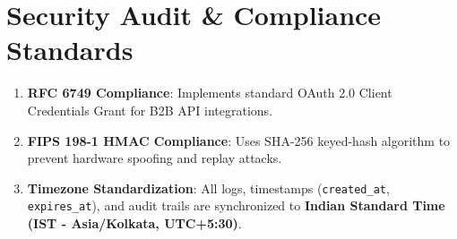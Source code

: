 \documentclass[12pt,a4paper]{article}
\begin{document}
\section{Security Audit \& Compliance Standards}
\begin{enumerate}
    \item \textbf{RFC 6749 Compliance}: Implements standard OAuth 2.0 Client Credentials Grant for B2B API integrations.
    \item \textbf{FIPS 198-1 HMAC Compliance}: Uses SHA-256 keyed-hash algorithm to prevent hardware spoofing and replay attacks.
    \item \textbf{Timezone Standardization}: All logs, timestamps (\texttt{created\_at}, \texttt{expires\_at}), and audit trails are synchronized to \textbf{Indian Standard Time (IST - Asia/Kolkata, UTC+5:30)}.
\end{enumerate}
\end{document}
